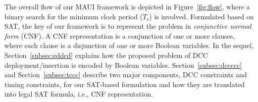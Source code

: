 The overall flow of our MAUI framework is depicted in Figure~\ref{fig:flow}, where a binary search for the minimum clock period ($T_c$) is involved. Formulated based on SAT, the key of our framework is to represent the problem in \textit{conjunctive normal form} (CNF). A CNF representation is a conjunction of one or more clauses, where each clause is a disjunction of one or more Boolean variables. In the sequel, Section~\ref{subsec:eddcd} explains how the proposed problem of DCC deployment/insertion is encoded by Boolean variables. Section~\ref{subsec:dccccc} and Section~\ref{subsec:tccc} describe two major components, DCC constraints and timing constraints, for our SAT-based formulation and how they are translated into legal SAT formula, i.e., CNF representation.


\begin{comment}
\subsection{Encoding for DCC and Technology Leader Deployment}
\label{subsec:eddcd}
The deployment/insertion problem of DCC and technology leader needs to be encoded into Boolean representation before being transformed into a SAT-based formulation. Assume that a total of $N$ types of DCCs can be chosen. Including the DCC-free case where no DCC is inserted, there are ($N$ + 1) possibilities of DCC insertion for each clock buffer. Furthermore, we also assume that a total of $M$ types of technology leaders can be chosen. Including the nominal case where no technology leader is inserted, there are ($M$ + 1) possibilities of technology leader insertion for each clock buffer. Note that, when a DCC/technology leader is inserted, it is inserted at the input of a buffer. We denote a clock buffer by $p\left(1 \leq p \leq P\right)$ where $P$ is the number of buffers. For each buffer, Boolean variables $B_{p,q}\left(1 \leq p \leq P, 1 \leq q \leq Q = \lceil \lg (N + 1)(M + 1)\rceil \right)$ are introduced where $\left\{B_{p,1}, B_{p,2},\dotsc, B_{p,Q}\right\}$ encode the aforementioned ($N$ + 1)($N$ + 1) possibilities of DCC insertion at the input of buffer $p$.
\end{comment}

